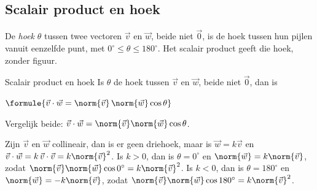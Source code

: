 \begin{oefeningen}
\end{oefeningen}

\subsection{Scalair product en hoek}

De \textit{hoek} $\theta$ tussen twee vectoren $\vec v$ en $\vec w$, beide niet $\vec 0$, is de hoek tussen hun pijlen vanuit eenzelfde punt, met $0^\circ \leqslant \theta \leqslant 180^\circ$. Het scalair product geeft die hoek, zonder figuur.

\begin{theorie}
\begin{stelling}{Scalair product en hoek}
Is $\theta$ de hoek tussen $\vec v$ en $\vec w$, beide niet $\vec 0$, dan is

\vspace{1mm}
\qquad $\formule{\vec v \cdot \vec w = \norm{\vec v}\,\norm{\vec w}\cos\theta}$
\end{stelling}
\begin{bewijs}
Vergelijk beide: $\vec v \cdot \vec w = \norm{\vec v}\norm{\vec w}\cos\theta$.

Zijn $\vec v$ en $\vec w$ collineair, dan is er geen driehoek, maar is $\vec w = k\vec v$ en $\vec v \cdot \vec w = k\,\vec v \cdot \vec v = k\norm{\vec v}^2$. Is $k > 0$, dan is $\theta = 0^\circ$ en $\norm{\vec w} = k\norm{\vec v}$, zodat $\norm{\vec v}\norm{\vec w}\cos 0^\circ = k\norm{\vec v}^2$. Is $k < 0$, dan is $\theta = 180^\circ$ en $\norm{\vec w} = -k\norm{\vec v}$, zodat $\norm{\vec v}\norm{\vec w}\cos 180^\circ = k\norm{\vec v}^2$.
\end{bewijs}
\end{theorie}

